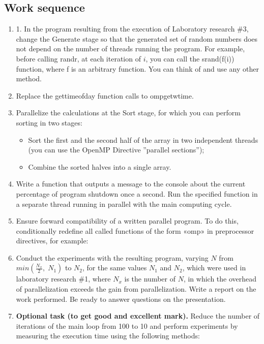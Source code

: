 { %
	\subsection{Work sequence}
	\begin{enumerate}
		\item1.	In the program resulting from the execution of Laboratory research \#3, change the Generate stage so that the generated set of random numbers does not depend on the number of threads running the program. For example, before calling rand\textunderscore r,  at each iteration of $i$, you can call the srand(f(i)) function, where f is an arbitrary function. You can think of and use any other method.
		\item Replace the gettimeofday function calls to omp\textunderscore get\textunderscore wtime.
		\item Parallelize the calculations at the Sort stage, for which you can perform sorting in two stages:
			\begin{itemize}
				\item Sort the first and the second half of the array in two independent threads (you can use the OpenMP Directive ''parallel sections''); 
				\item Combine the sorted halves into a single array.
			\end{itemize}
		\item Write a function that outputs a message to the console about the current percentage of program shutdown once a second. Run the specified function in a separate thread running in parallel with the main computing cycle.
		\item Ensure forward compatibility of a written parallel program. To do this, conditionally redefine all called functions of the form «omp\textunderscore *» in preprocessor directives, for example:
			\begin{figure}[H]
				
			\end{figure}
		\item Conduct the experiments with the resulting program, varying $N$ from $min(\frac{N_x}{2},\;N_1)$ to $N_2$, for the same values $N_1$ and $N_2$, which were used in laboratory research \#1, where $N_x$ is the number of $N$, in which the overhead of parallelization exceeds the gain from parallelization. Write a report on the work performed. Be ready to answer questions on the presentation.
		\item\textbf{Optional task (to get good and excellent mark).} Reduce the number of iterations of the main loop from 100 to 10 and perform experiments by measuring the execution time using the following methods:

\end{enumerate}}
